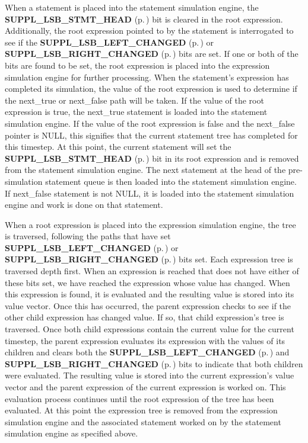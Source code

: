  When a statement is placed into the statement simulation engine, the {\bf SUPPL\_\-LSB\_\-STMT\_\-HEAD} {\rm (p.\,\pageref{group__expr__suppl_a3})}  bit is cleared in the root expression. Additionally, the root expression pointed to by  the statement is interrogated to see if the {\bf SUPPL\_\-LSB\_\-LEFT\_\-CHANGED} {\rm (p.\,\pageref{group__expr__suppl_a8})} or {\bf SUPPL\_\-LSB\_\-RIGHT\_\-CHANGED} {\rm (p.\,\pageref{group__expr__suppl_a9})}  bits are set. If one or both of the bits are found to be set, the root expression  is placed into the expression simulation engine for further processing. When the  statement's expression has completed its simulation, the value of the root expression  is used to determine if the next\_\-true or next\_\-false path will be taken. If the value  of the root expression is true, the next\_\-true statement is loaded into the statement  simulation engine. If the value of the root expression is false and the next\_\-false  pointer is NULL, this signifies that the current statement tree has completed for this  timestep. At this point, the current statement will set the {\bf SUPPL\_\-LSB\_\-STMT\_\-HEAD} {\rm (p.\,\pageref{group__expr__suppl_a3})} bit in  its root expression and is removed from the statement simulation engine. The next statement  at the head of the pre-simulation statement queue is then loaded into the statement  simulation engine. If next\_\-false statement is not NULL, it is loaded into the statement  simulation engine and work is done on that statement.

 When a root expression is placed into the expression simulation engine, the tree is traversed, following the paths that have set {\bf SUPPL\_\-LSB\_\-LEFT\_\-CHANGED} {\rm (p.\,\pageref{group__expr__suppl_a8})} or  {\bf SUPPL\_\-LSB\_\-RIGHT\_\-CHANGED} {\rm (p.\,\pageref{group__expr__suppl_a9})} bits set. Each expression tree is traversed depth first. When an  expression is reached that does not have either of these bits set, we have reached the expression whose value has changed. When this expression is found, it is evaluated and the resulting value is stored into its value vector. Once this has occurred, the parent expression checks to see if the other child expression has changed value. If so, that child expression's tree is traversed. Once both child expressions contain the current value for the current timestep, the parent expression evaluates its expression with the values of its children and clears both the {\bf SUPPL\_\-LSB\_\-LEFT\_\-CHANGED} {\rm (p.\,\pageref{group__expr__suppl_a8})} and {\bf SUPPL\_\-LSB\_\-RIGHT\_\-CHANGED} {\rm (p.\,\pageref{group__expr__suppl_a9})} bits to indicate that both children were evaluated. The resulting value is stored into the current expression's value vector and the parent expression of the current expression is worked on. This evaluation process continues until the root expression of the tree has been evaluated. At this point the expression tree is removed from the expression simulation engine and the associated statement worked on by the statement simulation engine as specified above.



